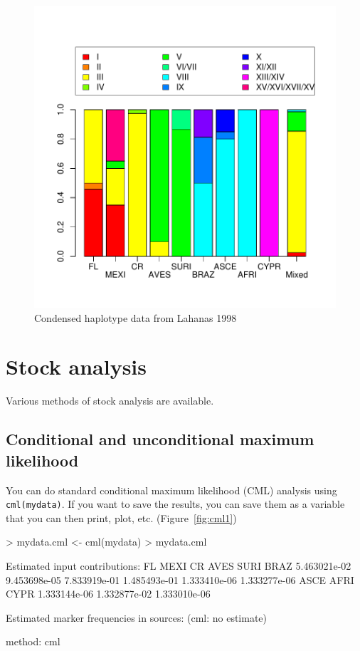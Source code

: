 \documentclass[11pt]{article}
\begin{document}
\begin{figure}
\includegraphics{mixstock-013}
\caption{Condensed haplotype data from Lahanas 1998}
\label{fig:condensed}
\end{figure}

\section{Stock analysis}
Various methods of stock analysis are available.

\subsection{Conditional and unconditional maximum likelihood}
You can do standard conditional maximum likelihood
(CML) analysis using \verb+cml(mydata)+.
If you want to save the results, you can save them
as a variable that you can then print, plot, etc.
(Figure~\ref{fig:cml1})
\begin{Schunk}
\begin{Sinput}
> mydata.cml <- cml(mydata)
> mydata.cml
\end{Sinput}
\begin{Soutput}
Estimated input contributions:
          FL         MEXI           CR         AVES         SURI         BRAZ 
5.463021e-02 9.453698e-05 7.833919e-01 1.485493e-01 1.333410e-06 1.333277e-06 
        ASCE         AFRI         CYPR 
1.333144e-06 1.332877e-02 1.333010e-06 

Estimated marker frequencies in sources:
(cml: no estimate)

method: cml 
\end{Soutput}
\end{Schunk}
\end{document}
